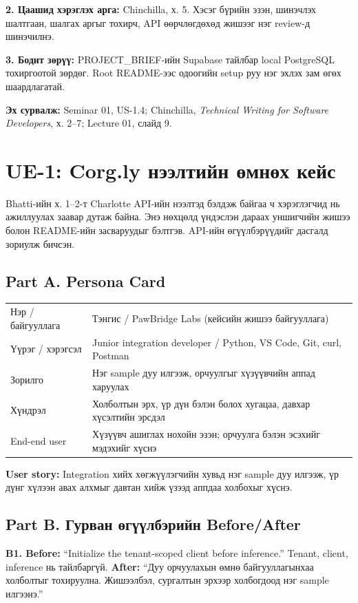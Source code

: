\documentclass[11pt,a4paper]{article}
\begin{document}
\textbf{2. Цаашид хэрэглэх арга:} Chinchilla, х. 5. Хэсэг бүрийн эзэн, шинэчлэх шалтгаан, шалгах аргыг тохирч, API өөрчлөгдөхөд жишээг нэг review-д шинэчилнэ.

\textbf{3. Бодит зөрүү:} PROJECT\_BRIEF-ийн Supabase тайлбар local PostgreSQL тохиргоотой зөрдөг. Root README-ээс одоогийн setup руу нэг эхлэх зам өгөх шаардлагатай.

\textbf{Эх сурвалж:} Seminar 01, US-1.4; Chinchilla, \textit{Technical Writing for Software Developers}, х. 2--7; Lecture 01, слайд 9.
\newpage
\section*{UE-1: Corg.ly нээлтийн өмнөх кейс}
Bhatti-ийн х. 1--2-т Charlotte API-ийн нээлтэд бэлдэж байгаа ч хэрэглэгчид нь ажиллуулах заавар дутаж байна. Энэ нөхцөлд үндэслэн дараах уншигчийн жишээ болон README-ийн засваруудыг бэлтгэв. API-ийн өгүүлбэрүүдийг дасгалд зориулж бичсэн.
\subsection*{Part A. Persona Card}
\par\noindent\begin{tabularx}{\linewidth}{@{}lX@{}}\toprule
Нэр / байгууллага & Тэнгис / PawBridge Labs (кейсийн жишээ байгууллага)\\
Үүрэг / хэрэгсэл & Junior integration developer / Python, VS Code, Git, curl, Postman\\
Зорилго & Нэг sample дуу илгээж, орчуулгыг хүзүүвчийн аппад харуулах\\
Хүндрэл & Холболтын эрх, үр дүн бэлэн болох хугацаа, давхар хүсэлтийн эрсдэл\\
End-end user & Хүзүүвч ашиглах нохойн эзэн; орчуулга бэлэн эсэхийг мэдэхийг хүснэ\\\bottomrule
\end{tabularx}\par
\textbf{User story:} Integration хийх хөгжүүлэгчийн хувьд нэг sample дуу илгээж, үр дүнг хүлээн авах алхмыг давтан хийж үзээд аппдаа холбохыг хүснэ.
\subsection*{Part B. Гурван өгүүлбэрийн Before/After}
\textbf{B1. Before:} ``Initialize the tenant-scoped client before inference.'' Tenant, client, inference нь тайлбаргүй. \textbf{After:} ``Дуу орчуулахын өмнө байгууллагынхаа холболтыг тохируулна. Жишээлбэл, сургалтын эрхээр холбогдоод нэг sample илгээнэ.''
\end{document}
